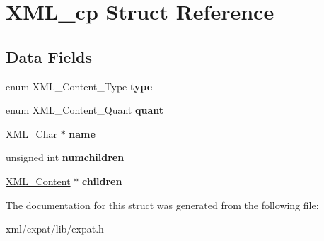 \hypertarget{struct_x_m_l__cp}{\section{X\-M\-L\-\_\-cp Struct Reference}
\label{struct_x_m_l__cp}
}
\subsection*{Data Fields}
\begin{DoxyCompactItemize}
\item 
\hypertarget{struct_x_m_l__cp_a98deeadbd7d0e20387a29f9030c2a397}{enum X\-M\-L\-\_\-\-Content\-\_\-\-Type {\bfseries type}}\label{struct_x_m_l__cp_a98deeadbd7d0e20387a29f9030c2a397}

\item 
\hypertarget{struct_x_m_l__cp_a85e6c8f3118df403b0d15491c93ae9e7}{enum X\-M\-L\-\_\-\-Content\-\_\-\-Quant {\bfseries quant}}\label{struct_x_m_l__cp_a85e6c8f3118df403b0d15491c93ae9e7}

\item 
\hypertarget{struct_x_m_l__cp_a7f06eaeb1604d4c2f2fa19f4dd13167c}{X\-M\-L\-\_\-\-Char $\ast$ {\bfseries name}}\label{struct_x_m_l__cp_a7f06eaeb1604d4c2f2fa19f4dd13167c}

\item 
\hypertarget{struct_x_m_l__cp_a5395f658297ee88a3ab45dfdbe389ef1}{unsigned int {\bfseries numchildren}}\label{struct_x_m_l__cp_a5395f658297ee88a3ab45dfdbe389ef1}

\item 
\hypertarget{struct_x_m_l__cp_a09c80a4bc4a029f785e262e9ca166b79}{\hyperlink{struct_x_m_l__cp}{X\-M\-L\-\_\-\-Content} $\ast$ {\bfseries children}}\label{struct_x_m_l__cp_a09c80a4bc4a029f785e262e9ca166b79}

\end{DoxyCompactItemize}


The documentation for this struct was generated from the following file\-:\begin{DoxyCompactItemize}
\item 
xml/expat/lib/expat.\-h\end{DoxyCompactItemize}
